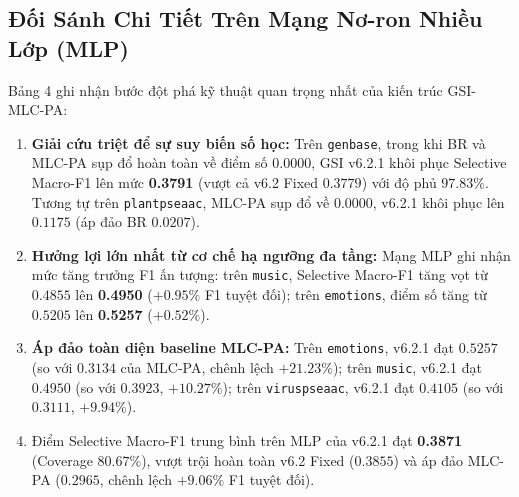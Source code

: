 \documentclass[10pt,a4paper,twoside]{article}
\begin{document}
\subsection{Đối Sánh Chi Tiết Trên Mạng Nơ-ron Nhiều Lớp (MLP)}
Bảng 4 ghi nhận bước đột phá kỹ thuật quan trọng nhất của kiến trúc GSI-MLC-PA:
\begin{enumerate}[leftmargin=*]
    \item \textbf{Giải cứu triệt để sự suy biến số học:} Trên \texttt{genbase}, trong khi BR và MLC-PA sụp đổ hoàn toàn về điểm số $0.0000$, GSI v6.2.1 khôi phục Selective Macro-F1 lên mức \textbf{0.3791} (vượt cả v6.2 Fixed $0.3779$) với độ phủ $97.83\%$. Tương tự trên \texttt{plantpseaac}, MLC-PA sụp đổ về $0.0000$, v6.2.1 khôi phục lên $0.1175$ (áp đảo BR $0.0207$).
    \item \textbf{Hưởng lợi lớn nhất từ cơ chế hạ ngưỡng đa tầng:} Mạng MLP ghi nhận mức tăng trưởng F1 ấn tượng: trên \texttt{music}, Selective Macro-F1 tăng vọt từ $0.4855$ lên \textbf{0.4950} ($+0.95\%$ F1 tuyệt đối); trên \texttt{emotions}, điểm số tăng từ $0.5205$ lên \textbf{0.5257} ($+0.52\%$).
    \item \textbf{Áp đảo toàn diện baseline MLC-PA:} Trên \texttt{emotions}, v6.2.1 đạt $0.5257$ (so với $0.3134$ của MLC-PA, chênh lệch $+21.23\%$); trên \texttt{music}, v6.2.1 đạt $0.4950$ (so với $0.3923$, $+10.27\%$); trên \texttt{viruspseaac}, v6.2.1 đạt $0.4105$ (so với $0.3111$, $+9.94\%$).
    \item Điểm Selective Macro-F1 trung bình trên MLP của v6.2.1 đạt \textbf{0.3871} (Coverage $80.67\%$), vượt trội hoàn toàn v6.2 Fixed ($0.3855$) và áp đảo MLC-PA ($0.2965$, chênh lệch $+9.06\%$ F1 tuyệt đối).
\end{enumerate}
\end{document}
